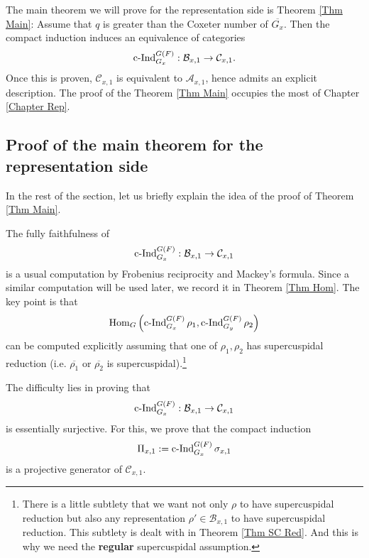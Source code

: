 The main theorem we will prove for the representation side is Theorem \ref{Thm Main}: Assume that $q$ is greater than the Coxeter number of $\overline{G_x}$. Then the compact induction induces an equivalence of categories
$$\operatorname{\operatorname{c-Ind}}_{G_x}^{G(F)}: \mathcal{B}_{x,1} \to \mathcal{C}_{x,1}.$$
Once this is proven, $\mathcal{C}_{x,1}$ is equivalent to $\mathcal{A}_{x,1}$, hence admits an explicit description. The proof of the Theorem \ref{Thm Main} occupies the most of Chapter \ref{Chapter Rep}. 

\subsection{Proof of the main theorem for the representation side}

In the rest of the section, let us briefly explain the idea of the proof of Theorem \ref{Thm Main}.

The fully faithfulness of 
$$\operatorname{\operatorname{c-Ind}}_{G_x}^{G(F)}: \mathcal{B}_{x,1} \to \mathcal{C}_{x,1}$$
is a usual computation by Frobenius reciprocity and Mackey's formula. Since a similar computation will be used later, we record it in Theorem \ref{Thm Hom}. The key point is that 
$$\operatorname{\operatorname{Hom}}_G\left(\operatorname{\operatorname{c-Ind}}_{G_x}^{G(F)}\rho_1, \operatorname{\operatorname{c-Ind}}_{G_y}^{G(F)}\rho_2\right)$$
can be computed explicitly assuming that one of $\rho_1, \rho_2$ has supercuspidal reduction (i.e. $\overline{\rho_1}$ or $\overline{\rho_2}$ is supercuspidal).\footnote{There is a little subtlety that we want not only $\rho$ to have supercuspidal reduction but also any representation $\rho' \in \mathcal{B}_{x,1}$ to have supercuspidal reduction. This subtlety is dealt with in Theorem \ref{Thm SC Red}. And this is why we need the \textbf{regular} supercuspidal assumption. }


The difficulty lies in proving that
$$\operatorname{\operatorname{c-Ind}}_{G_x}^{G(F)}: \mathcal{B}_{x,1} \to \mathcal{C}_{x,1}$$
is essentially surjective. For this, we prove that the compact induction $$\Pi_{x,1}:=\operatorname{\operatorname{c-Ind}}_{G_x}^{G(F)}\sigma_{x,1}$$ 
is a projective generator of $\mathcal{C}_{x,1}$. 


